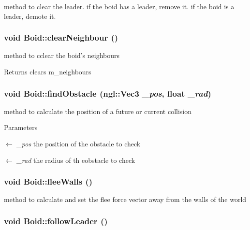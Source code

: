 method to clear the leader. if the boid has a leader, remove it. if the boid is a leader, demote it. \hypertarget{classBoid_aeb1fd57777cec9eab3f735312c2a2599}{
\subsubsection[{clearNeighbour}]{\setlength{\rightskip}{0pt plus 5cm}void Boid::clearNeighbour ()}}
\label{classBoid_aeb1fd57777cec9eab3f735312c2a2599}


method to cclear the boid's neighbours \begin{DoxyReturn}{Returns}
clears m\_\-neighbours 
\end{DoxyReturn}
\hypertarget{classBoid_aafd5acdcef1b743451a383aa75fe47a2}{
\subsubsection[{findObstacle}]{\setlength{\rightskip}{0pt plus 5cm}void Boid::findObstacle (ngl::Vec3 {\em \_\-pos}, \/  float {\em \_\-rad})}}
\label{classBoid_aafd5acdcef1b743451a383aa75fe47a2}


method to calculate the position of a future or current collision 
\begin{DoxyParams}{Parameters}
\item[\mbox{$\leftarrow$} {\em \_\-pos}]the position of the obstacle to check \item[\mbox{$\leftarrow$} {\em \_\-rad}]the radius of th eobstacle to check \end{DoxyParams}
\hypertarget{classBoid_a15072ed180111166238fe7b9022a93d3}{
\subsubsection[{fleeWalls}]{\setlength{\rightskip}{0pt plus 5cm}void Boid::fleeWalls ()}}
\label{classBoid_a15072ed180111166238fe7b9022a93d3}


method to calculate and set the flee force vector away from the walls of the world \hypertarget{classBoid_a7b06459d98d91fba81f0976ab4a2c5db}{
\subsubsection[{followLeader}]{\setlength{\rightskip}{0pt plus 5cm}void Boid::followLeader ()}}
\label{classBoid_a7b06459d98d91fba81f0976ab4a2c5db}


